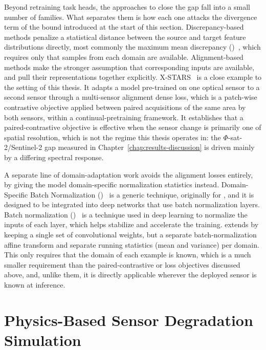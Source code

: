 Beyond retraining task heads, the approaches to close the gap fall into a small number of families.
What separates them is how each one attacks the divergence term of the bound introduced at the start of this section.
Discrepancy-based methods penalize a statistical distance between the source and target feature distributions directly, most commonly the maximum mean discrepancy ()~\cite{gretton2012kernel}, which requires only that samples from each domain are available.
Alignment-based methods make the stronger assumption that corresponding inputs are available, and pull their representations together explicitly.
X-STARS~\cite{marsocci2025cross} is a close example to the setting of this thesis.
It adapts a model pre-trained on one optical sensor to a second sensor through a multi-sensor alignment dense loss, which is a patch-wise contrastive objective applied between paired acquisitions of the same area by both sensors, within a continual-pretraining framework.
It establishes that a paired-contrastive objective is effective when the sensor change is primarily one of spatial resolution, which is not the regime this thesis operates in: the $\Phi$-sat-2/Sentinel-2 gap measured in Chapter~\ref{chap:results-discussion} is driven mainly by a differing spectral response.

A separate line of domain-adaptation work avoids the alignment losses entirely, by giving the model domain-specific normalization statistics instead.
Domain-Specific Batch Normalization ()~\cite{chang2019dsbn} is a generic technique, originally for , and it is designed to be integrated into deep networks that use batch normalization layers.
Batch normalization ()~\cite{ioffe2015batchnorm} is a technique used in deep learning to normalize the inputs of each layer, which helps stabilize and accelerate the training.
 extends  by keeping a single set of convolutional weights, but a separate batch-normalization affine transform and separate running statistics (mean and variance) per domain.
This only requires that the domain of each example is known, which is a much smaller requirement than the paired-contrastive or  loss objectives discussed above, and, unlike them, it is directly applicable wherever the deployed sensor is known at inference.

\section{Physics-Based Sensor Degradation Simulation}

